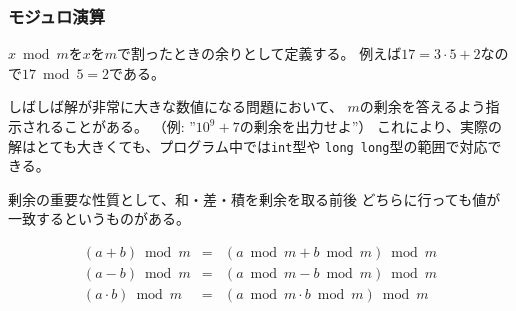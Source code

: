 \begin{comment}
\subsubsection{Modular arithmetic}

\index{remainder}
\index{modular arithmetic}
\end{comment}

\subsubsection{モジュロ演算}


\begin{comment}
We denote by $x \bmod m$ the remainder
when $x$ is divided by $m$.
For example, $17 \bmod 5 = 2$,
because $17 = 3 \cdot 5 + 2$.

Sometimes, the answer to a problem is a
very large number but it is enough to
output it ''modulo $m$'', i.e.,
the remainder when the answer is divided by $m$
(for example, ''modulo $10^9+7$'').
The idea is that even if the actual answer
is very large,
it suffices to use the types
\texttt{int} and \texttt{long long}.
\end{comment}

$x \bmod m$を$x$を$m$で割ったときの余りとして定義する。
例えば$17 = 3 \cdot 5 + 2$なので$17 \bmod 5 = 2$である。

しばしば解が非常に大きな数値になる問題において、
$m$の剰余を答えるよう指示されることがある。
（例: ''$10^9+7$の剰余を出力せよ''）
これにより、実際の解はとても大きくても、プログラム中では\texttt{int}型や
\texttt{long long}型の範囲で対応できる。

\begin{comment}
An important property of the remainder is that
in addition, subtraction and multiplication,
the remainder can be taken before the operation:
\end{comment}

剰余の重要な性質として、和・差・積を剰余を取る前後
どちらに行っても値が一致するというものがある。

\[
\begin{array}{rcr}
(a+b) \bmod m & = & (a \bmod m + b \bmod m) \bmod m \\
(a-b) \bmod m & = & (a \bmod m - b \bmod m) \bmod m \\
(a \cdot b) \bmod m & = & (a \bmod m \cdot b \bmod m) \bmod m
\end{array}
\]

